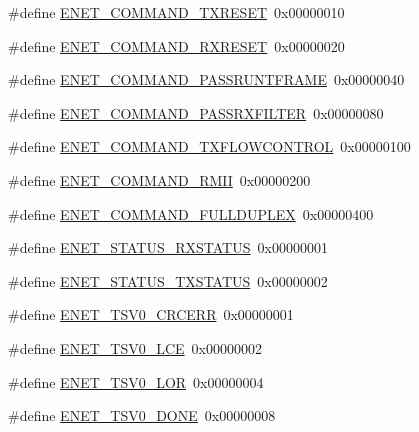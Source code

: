\begin{DoxyCompactItemize}
\#define \hyperlink{group___e_n_e_t__17_x_x__40_x_x_gab9c38db14b3c0edbe8f9a9062d653612}{E\+N\+E\+T\+\_\+\+C\+O\+M\+M\+A\+N\+D\+\_\+\+T\+X\+R\+E\+S\+E\+T}~0x00000010
\item 
\#define \hyperlink{group___e_n_e_t__17_x_x__40_x_x_gabcbc994bca6d1eb4b677e8f8c58e3ef9}{E\+N\+E\+T\+\_\+\+C\+O\+M\+M\+A\+N\+D\+\_\+\+R\+X\+R\+E\+S\+E\+T}~0x00000020
\item 
\#define \hyperlink{group___e_n_e_t__17_x_x__40_x_x_ga22c8103c39e17d184acb4956428022c8}{E\+N\+E\+T\+\_\+\+C\+O\+M\+M\+A\+N\+D\+\_\+\+P\+A\+S\+S\+R\+U\+N\+T\+F\+R\+A\+M\+E}~0x00000040
\item 
\#define \hyperlink{group___e_n_e_t__17_x_x__40_x_x_gad15a361a9ea2dae055b13d1416dde2df}{E\+N\+E\+T\+\_\+\+C\+O\+M\+M\+A\+N\+D\+\_\+\+P\+A\+S\+S\+R\+X\+F\+I\+L\+T\+E\+R}~0x00000080
\item 
\#define \hyperlink{group___e_n_e_t__17_x_x__40_x_x_ga720037c58537b876089d9d3f4df0130f}{E\+N\+E\+T\+\_\+\+C\+O\+M\+M\+A\+N\+D\+\_\+\+T\+X\+F\+L\+O\+W\+C\+O\+N\+T\+R\+O\+L}~0x00000100
\item 
\#define \hyperlink{group___e_n_e_t__17_x_x__40_x_x_ga933d30adf6557d69ddcd1bd0ff3dd3b5}{E\+N\+E\+T\+\_\+\+C\+O\+M\+M\+A\+N\+D\+\_\+\+R\+M\+I\+I}~0x00000200
\item 
\#define \hyperlink{group___e_n_e_t__17_x_x__40_x_x_gac5380c0bb8853772b22db6b37b2c812e}{E\+N\+E\+T\+\_\+\+C\+O\+M\+M\+A\+N\+D\+\_\+\+F\+U\+L\+L\+D\+U\+P\+L\+E\+X}~0x00000400
\item 
\#define \hyperlink{group___e_n_e_t__17_x_x__40_x_x_gad0face01c298deb04c2a6df44839db44}{E\+N\+E\+T\+\_\+\+S\+T\+A\+T\+U\+S\+\_\+\+R\+X\+S\+T\+A\+T\+U\+S}~0x00000001
\item 
\#define \hyperlink{group___e_n_e_t__17_x_x__40_x_x_gae74d3a5997ed8bf6618a4896b12403e8}{E\+N\+E\+T\+\_\+\+S\+T\+A\+T\+U\+S\+\_\+\+T\+X\+S\+T\+A\+T\+U\+S}~0x00000002
\item 
\#define \hyperlink{group___e_n_e_t__17_x_x__40_x_x_gadb4cb33d047889ef5584d58ee0110140}{E\+N\+E\+T\+\_\+\+T\+S\+V0\+\_\+\+C\+R\+C\+E\+R\+R}~0x00000001
\item 
\#define \hyperlink{group___e_n_e_t__17_x_x__40_x_x_gaca1a7e04bad3d3a31621f81ee11e7833}{E\+N\+E\+T\+\_\+\+T\+S\+V0\+\_\+\+L\+C\+E}~0x00000002
\item 
\#define \hyperlink{group___e_n_e_t__17_x_x__40_x_x_gadf4b40d301d071e9f0a7819ad45dc534}{E\+N\+E\+T\+\_\+\+T\+S\+V0\+\_\+\+L\+O\+R}~0x00000004
\item 
\#define \hyperlink{group___e_n_e_t__17_x_x__40_x_x_ga93ca8c0d6c7224b4a8c41a077bbdf40d}{E\+N\+E\+T\+\_\+\+T\+S\+V0\+\_\+\+D\+O\+N\+E}~0x00000008

\end{DoxyCompactItemize}
